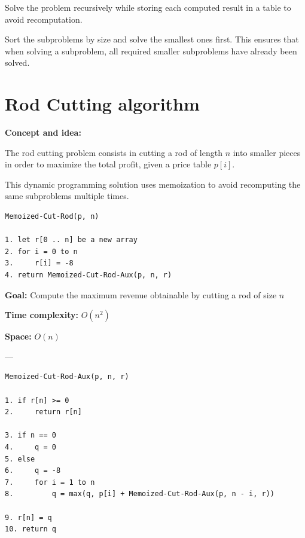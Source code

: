 \documentclass[11pt,a4paper,openany]{book}
\begin{document}
\begin{defnbox}[title=Top-down with Memoization]
Solve the problem recursively while storing each computed result in a table to avoid recomputation.
\end{defnbox}

\begin{defnbox}[title=Bottom-up Approach]
Sort the subproblems by size and solve the smallest ones first.  
This ensures that when solving a subproblem, all required smaller subproblems have already been solved.
\end{defnbox}








\vspace{2cm}




\section{Rod Cutting algorithm}

\textbf{Concept and idea:}

The rod cutting problem consists in cutting a rod of length $n$ into smaller pieces in order to maximize the total profit, given a price table $p[i]$.

This dynamic programming solution uses memoization to avoid recomputing the same subproblems multiple times.

\begin{lstlisting}
Memoized-Cut-Rod(p, n)

1. let r[0 .. n] be a new array
2. for i = 0 to n
3.     r[i] = -8
4. return Memoized-Cut-Rod-Aux(p, n, r)
\end{lstlisting}

\textbf{Goal:} Compute the maximum revenue obtainable by cutting a rod of size $n$

\textbf{Time complexity:} $O(n^2)$

\textbf{Space:} $O(n)$

---

\begin{lstlisting}
Memoized-Cut-Rod-Aux(p, n, r)

1. if r[n] >= 0
2.     return r[n]

3. if n == 0
4.     q = 0
5. else
6.     q = -8
7.     for i = 1 to n
8.         q = max(q, p[i] + Memoized-Cut-Rod-Aux(p, n - i, r))

9. r[n] = q
10. return q
\end{lstlisting}
\end{document}
